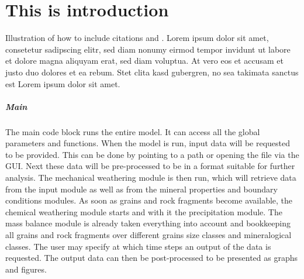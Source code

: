 \chapter{This is introduction}\label{ch:introduction}

\instructionsintroduction


Illustration of how to include citations \cite{Meert2011PhD} and \cite{VandenBroeck2011IJCAI}. Lorem ipsum dolor sit amet, consetetur sadipscing elitr, sed diam nonumy eirmod tempor invidunt ut labore et dolore magna aliquyam erat, sed diam voluptua. At vero eos et accusam et justo duo dolores et ea rebum. Stet clita kasd gubergren, no sea takimata sanctus est Lorem ipsum dolor sit amet.

\paragraph{Main}
The main code block runs the entire model. It can access all the global parameters and functions. When the model is run, input data will be requested to be provided. This can be done by pointing to a path or opening the file via the GUI. Next these data will be pre-processed to be in a format suitable for further analysis. The mechanical weathering module is then run, which will retrieve data from the input module as well as from the mineral properties and boundary conditions modules. As soon as grains and rock fragments become available, the chemical weathering module starts and with it the precipitation module. The mass balance module is already taken everything into account and bookkeeping all grains and rock fragments over different grains size classes and mineralogical classes. The user may specify at which time steps an output of the data is requested. The output data can then be post-processed to be presented as graphs and figures.

